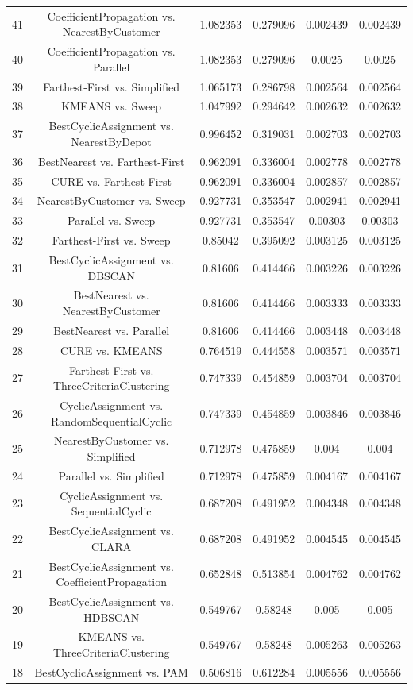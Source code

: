 \documentclass[a4paper,10pt]{article}
\begin{document}
\begin{landscape}
\begin{table}[!htp]
\begin{tabular}{cccccc}
41&CoefficientPropagation vs. NearestByCustomer&1.082353&0.279096&0.002439&0.002439\\
40&CoefficientPropagation vs. Parallel&1.082353&0.279096&0.0025&0.0025\\
39&Farthest-First vs. Simplified&1.065173&0.286798&0.002564&0.002564\\
38&KMEANS vs. Sweep&1.047992&0.294642&0.002632&0.002632\\
37&BestCyclicAssignment vs. NearestByDepot&0.996452&0.319031&0.002703&0.002703\\
36&BestNearest vs. Farthest-First&0.962091&0.336004&0.002778&0.002778\\
35&CURE vs. Farthest-First&0.962091&0.336004&0.002857&0.002857\\
34&NearestByCustomer vs. Sweep&0.927731&0.353547&0.002941&0.002941\\
33&Parallel vs. Sweep&0.927731&0.353547&0.00303&0.00303\\
32&Farthest-First vs. Sweep&0.85042&0.395092&0.003125&0.003125\\
31&BestCyclicAssignment vs. DBSCAN&0.81606&0.414466&0.003226&0.003226\\
30&BestNearest vs. NearestByCustomer&0.81606&0.414466&0.003333&0.003333\\
29&BestNearest vs. Parallel&0.81606&0.414466&0.003448&0.003448\\
28&CURE vs. KMEANS&0.764519&0.444558&0.003571&0.003571\\
27&Farthest-First vs. ThreeCriteriaClustering&0.747339&0.454859&0.003704&0.003704\\
26&CyclicAssignment vs. RandomSequentialCyclic&0.747339&0.454859&0.003846&0.003846\\
25&NearestByCustomer vs. Simplified&0.712978&0.475859&0.004&0.004\\
24&Parallel vs. Simplified&0.712978&0.475859&0.004167&0.004167\\
23&CyclicAssignment vs. SequentialCyclic&0.687208&0.491952&0.004348&0.004348\\
22&BestCyclicAssignment vs. CLARA&0.687208&0.491952&0.004545&0.004545\\
21&BestCyclicAssignment vs. CoefficientPropagation&0.652848&0.513854&0.004762&0.004762\\
20&BestCyclicAssignment vs. HDBSCAN&0.549767&0.58248&0.005&0.005\\
19&KMEANS vs. ThreeCriteriaClustering&0.549767&0.58248&0.005263&0.005263\\
18&BestCyclicAssignment vs. PAM&0.506816&0.612284&0.005556&0.005556\\

\end{tabular}
\end{table}
\end{landscape}
\end{document}
